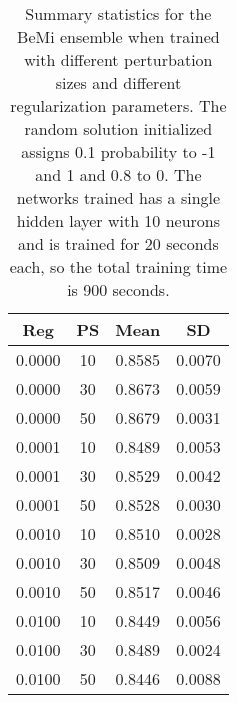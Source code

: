 \begin{center}
\begin{table}[H]
\centering
\begin{tabular}{|c|c|c|c|}
  \hline
Reg & PS & Mean & SD \\ 
  \hline
0.0000 &  10 & 0.8585 & 0.0070 \\ 
   \hline
0.0000 &  30 & 0.8673 & 0.0059 \\ 
   \hline
0.0000 &  50 & 0.8679 & 0.0031 \\ 
   \hline
0.0001 &  10 & 0.8489 & 0.0053 \\ 
   \hline
0.0001 &  30 & 0.8529 & 0.0042 \\ 
   \hline
0.0001 &  50 & 0.8528 & 0.0030 \\ 
   \hline
0.0010 &  10 & 0.8510 & 0.0028 \\ 
   \hline
0.0010 &  30 & 0.8509 & 0.0048 \\ 
   \hline
0.0010 &  50 & 0.8517 & 0.0046 \\ 
   \hline
0.0100 &  10 & 0.8449 & 0.0056 \\ 
   \hline
0.0100 &  30 & 0.8489 & 0.0024 \\ 
   \hline
0.0100 &  50 & 0.8446 & 0.0088 \\ 
   \hline
\end{tabular}
\caption{Summary statistics for the BeMi ensemble when trained with different perturbation sizes and 
          different regularization parameters. The random solution initialized assigns 0.1 probability to -1 and 1
          and 0.8 to 0. The networks trained has a single hidden layer with 10 neurons and is trained for
          20 seconds each, so the total training time is 900 seconds.} 
\label{BEMI_TNN}
\end{table}

\end{center}
